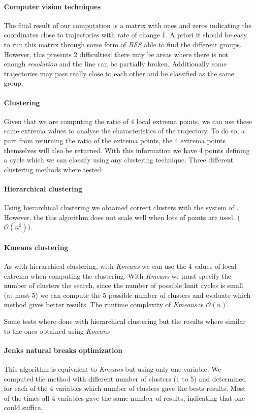 \paragraph{Computer vision techniques}
The final result of our computation is a matrix with ones and zeros indicating
the coordinates close to trajectories with rate of change 1. A priori it should
be easy to run this matrix through some form of \emph{BFS} able to find the
different groups. However, this presents 2 difficulties: there may be areas
where there is not enough \emph{resolution} and the line can be partially
broken. Additionally some trajectories may pass really close to each other and
be classified as the same group.

\paragraph{Clustering}
Given that we are computing the ratio of 4 local extrema points, we can use
these same extrema values to analyse the characteristics of the trajectory. To
do so, a part from returning the ratio of the extrema points, the 4 extrema
points themselves will also be returned. With this information we have 4 points
defining a cycle which we can classify using any clustering technique. Three
different clustering methods where tested:

\paragraph{Hierarchical clustering}

Using hierarchical clustering we obtained correct clusters with the system of
\cite{kuznetsov_visualization_2013}. However, the this algorithm does not scale
well when lots of points are used. ($\mathcal{O}(n^2)$).


\paragraph{Kmeans clustering}

As with hierarchical clustering, with \emph{Kmeans} we can use the 4 values of
local extrema when computing the clustering.  With \emph{Kmeans} we must specify
the number of clusters the search, since the number of possible limit cycles is
small (at most 5) we can compute the 5 possible number of clusters and evaluate
which method gives better results. The runtime complexity of \emph{Kmeans} is
$\mathcal{O}(n)$.

Some tests where done with hierarchical clustering but the
results where similar to the ones obtained using \emph{Kmeans}

\paragraph{Jenks natural breaks optimization}

This algorithm is equivalent to \emph{Kmeans} but using only one variable.
We computed the method with different number of clusters (1 to 5) and determined
for each of the 4 variables which number of clusters gave the bests results.
Most of the times all 4 variables gave the same number of results, indicating
that one could suffice.

